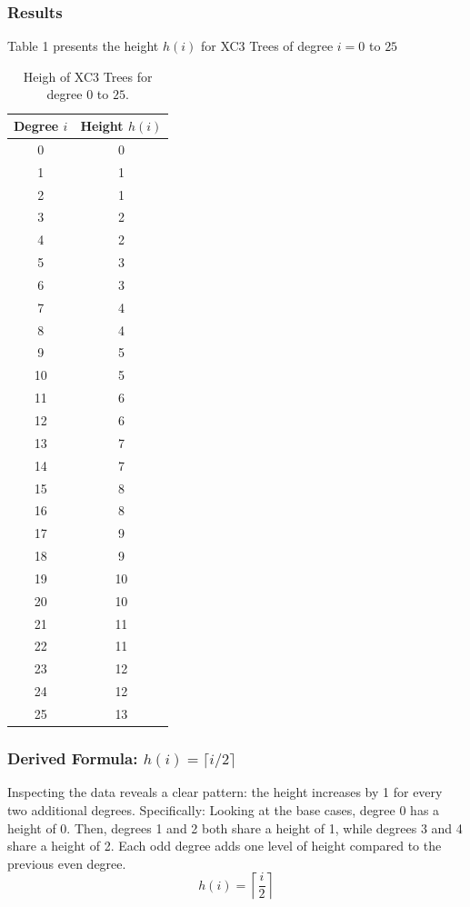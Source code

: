 \documentclass[letterpaper]{article}
\theoremstyle{plain}
\theoremstyle{definition}
\theoremstyle{remark}
\begin{document}
\subsubsection*{Results}
Table 1 presents the height $h(i)$ for XC3 Trees of degree $i = 0$ to $25$
\begin{table}[h]
\centering
\begin{tabular}{|c|c|}
\hline
Degree $i$ & Height $h(i)$ \\
\hline
0  & 0 \\
1  & 1 \\
2  & 1 \\
3  & 2 \\
4  & 2 \\
5  & 3 \\
6  & 3 \\
7  & 4 \\
8  & 4 \\
9  & 5 \\
10 & 5 \\
11 & 6 \\
12 & 6 \\
13 & 7 \\
14 & 7 \\
15 & 8 \\
16 & 8 \\
17 & 9 \\
18 & 9 \\
19 & 10 \\
20 & 10 \\
21 & 11 \\
22 & 11 \\
23 & 12 \\
24 & 12 \\
25 & 13 \\
\hline    
\end{tabular}
\caption{Heigh of XC3 Trees for degree $0$ to $25$.}
\label{table:xc3height}
\end{table}

\subsubsection*{Derived Formula: $h(i) = \lceil i/2 \rceil$}

Inspecting the data reveals a clear pattern: the height increases by 1 for every two additional degrees. 
Specifically: Looking at the base cases, degree 0 has a height of 0. Then, degrees 1 and 2 both share 
a height of 1,  while degrees 3 and 4 share a height of 2. Each odd degree adds one level of height
compared to the previous even degree.
$$h(i) = \left\lceil\frac{i}{2}\right\rceil$$
\end{document}
